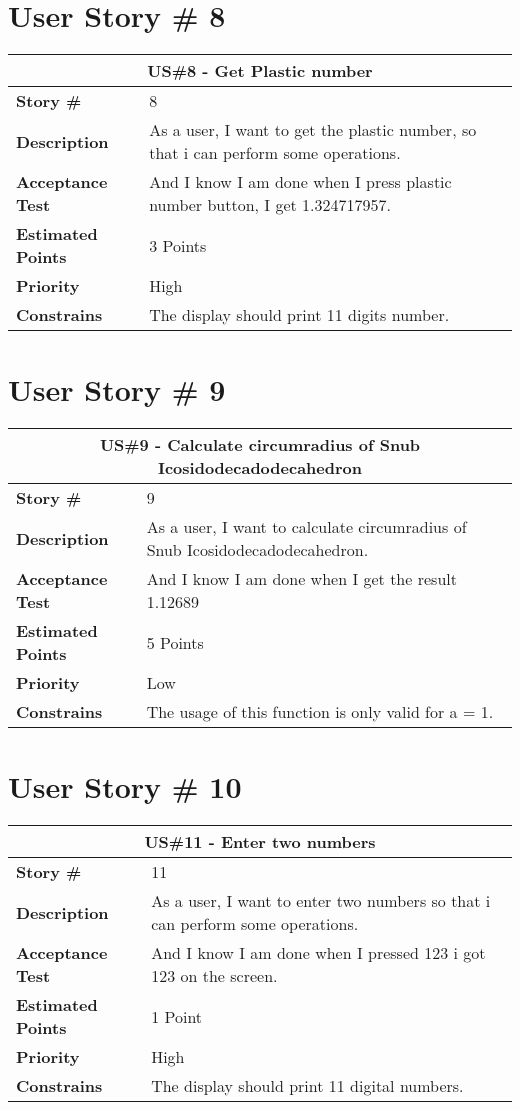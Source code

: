 \documentclass{report}
\begin{document}
\section{User Story \# 8}
\begin{tabular}{|p{3cm}|p{9cm}| }
\hline
\multicolumn{2}{|c|}{US\#8 - Get Plastic number} \\
\hline
\textbf {Story \#}& 8\\
\hline
\textbf{Description}& As a user, I want to get the plastic number, so that i can perform some operations.\\
\hline
\textbf{Acceptance Test}& And I know I am done when I press plastic number button, I get 1.324717957. \\
\hline
\textbf{Estimated Points} & 3 Points \\
\hline
\textbf{Priority} & High \\
\hline
\textbf{Constrains}& The display should print 11 digits number.\\
\hline
\end{tabular}

\section{User Story \# 9}
\begin{tabular}{|p{3cm}|p{9cm}| }
\hline
\multicolumn{2}{|c|}{US\#9 - Calculate circumradius of Snub Icosidodecadodecahedron} \\
\hline
\textbf {Story \#}& 9\\
\hline
\textbf{Description}& As a user, I want to calculate circumradius of Snub Icosidodecadodecahedron.\\
\hline
\textbf{Acceptance Test}& And I know I am done when I get the result 1.12689 \\
\hline
\textbf{Estimated Points} & 5 Points \\
\hline
\textbf{Priority} & Low \\
\hline
\textbf{Constrains}& The usage of this function is only valid for a = 1.\\
\hline
\end{tabular}

\section{User Story \# 10}
\begin{tabular}{|p{3cm}|p{9cm}| }
\hline
\multicolumn{2}{|c|}{US\#11 - Enter two numbers} \\
\hline
\textbf {Story \#}& 11\\
\hline
\textbf{Description}& As a user, I want to enter two numbers so that i can perform some operations.\\
\hline
\textbf{Acceptance Test}& And I know I am done when I pressed 123 i got 123 on the screen. \\
\hline
\textbf{Estimated Points} & 1 Point \\
\hline
\textbf{Priority} & High \\
\hline
\textbf{Constrains}& The display should print 11 digital numbers.\\
\hline
\end{tabular}
\end{document}

